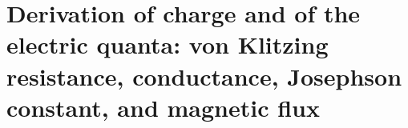 \chapter{Derivation of charge and of the electric quanta: von Klitzing resistance, conductance, Josephson constant, and magnetic flux}
\label{chap:p3-final:40:cuantos_electricos}

